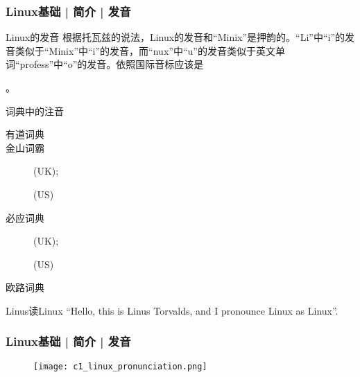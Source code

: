 \begin{frame}
  \frametitle{Linux基础 | 简介 | 发音}
  \begin{block}{Linux的发音}
  根据托瓦兹的说法，Linux的发音和“Minix”是押韵的。“Li”中“i”的发音类似于“Minix”中“i”的发音，而“nux”中“u”的发音类似于英文单词“profess”中“o”的发音。依照国际音标应该是\begin{IPA}[tt]['lIn@ks]\end{IPA}。
  \end{block}
  \pause
  \begin{block}{词典中的注音}
    \begin{description}
      \item[有道词典] \begin{IPA}[tt]['lIn@ks]\end{IPA}
      \item[金山词霸] \begin{IPA}[tt]['lIn@ks]\end{IPA}(UK); \begin{IPA}[tt]['lIn@ks]\end{IPA}(US)
      \item[必应词典] \begin{IPA}[tt]['lIn@ks]\end{IPA}(UK); \begin{IPA}[tt]['laIn2ks]\end{IPA}(US)
      \item[欧路词典] \begin{IPA}[tt]['laIn2ks]\end{IPA}
    \end{description}
  \end{block}
  \pause
  \begin{block}{Linus读Linux}
    ``Hello, this is Linus Torvalds, and I pronounce Linux as Linux''.
  \end{block}
\end{frame}

\begin{frame}
  \frametitle{Linux基础 | 简介 | 发音}
  \begin{figure}
    \centering
    \texttt{[image: c1\_linux\_pronunciation.png]}
  \end{figure}
\end{frame}

